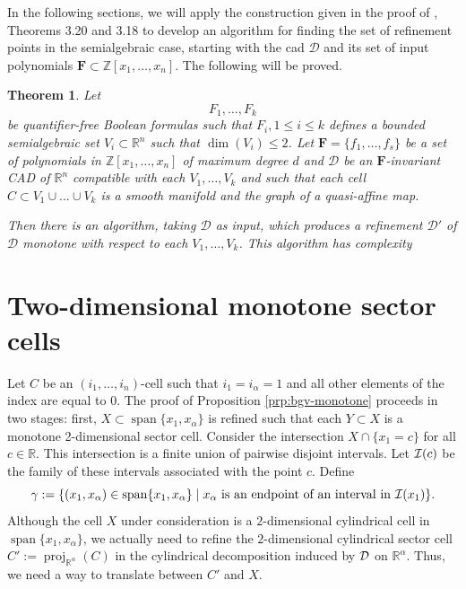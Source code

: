 \documentclass[
]{book}
\newtheorem{theorem}{Theorem}[chapter]
\theoremstyle{definition}
\theoremstyle{definition}
\theoremstyle{definition}
\theoremstyle{definition}
\theoremstyle{remark}
\begin{document}
In the following sections, we will apply the construction given in the proof of \citet{bgv15}, Theorems 3.20 and 3.18 to develop an algorithm for finding the set of refinement points in the semialgebraic case, starting with the cad \(\mathcal{D}\) and its set of input polynomials \(\mathbf{F} \subset \mathbb{Z}[x_1,\ldots,x_n]\). The following will be proved.

\begin{theorem}
\protect\hypertarget{thm:bgv-monotone-algorithm}{}\label{thm:bgv-monotone-algorithm}Let
\[
F_1,\ldots,F_k
\]
be quantifier-free Boolean formulas such that \(F_i, 1\le i \le k\) defines a bounded semialgebraic set \(V_i \subset \mathbb{R}^n\) such that \(\dim(V_i) \le 2\).
Let \(\mathbf{F} = \{f_1,\ldots,f_s\}\) be a set of polynomials in \(\mathbb{Z}[x_1,\ldots,x_n]\) of maximum degree \(d\) and \(\mathcal{D}\) be an \(\mathbf{F}\)-invariant CAD of \(\mathbb{R}^n\) compatible with each \(V_1,\ldots,V_k\) and such that each cell \(C \subset V_1\cup\ldots\cup V_k\) is a smooth manifold and the graph of a quasi-affine map.

Then there is an algorithm, taking \(\mathcal{D}\) as input, which produces a refinement \(\mathcal{D'}\) of \(\mathcal{D}\) monotone with respect to each \(V_1, \ldots, V_k\).
This algorithm has complexity
\end{theorem}

\hypertarget{sec:monotone-sectors}{%
\section{Two-dimensional monotone sector cells}\label{sec:monotone-sectors}}

Let \(C\) be an \((i_1,\ldots,i_n)\)-cell such that \(i_1 = i_\alpha = 1\) and all other elements of the index are equal to \(0\).
The proof of Proposition \ref{prp:bgv-monotone} proceeds in two stages: first, \(X \subset {\operatorname{span} \{x_1,x_\alpha\}}\) is refined such that each \(Y \subset X\) is a monotone 2-dimensional sector cell.
Consider the intersection \(X \cap \{x_1 = c\}\) for all \(c\in \mathbb{R}\). This intersection is a finite union of pairwise disjoint intervals. Let \({\cal I} (c)\) be the family of these intervals associated with the point \(c\). Define
\[
\gamma := \{ (x_1,x_\alpha) \in {\operatorname{span} \{x_1,x_\alpha\}} \mid x_\alpha \text{ is an endpoint of an interval in } {\cal I}(x_1) \}.
\]
Although the cell \(X\) under consideration is a \(2\)-dimensional cylindrical cell in \({\operatorname{span} \{x_1,x_\alpha\}}\), we actually need to refine the \(2\)-dimensional cylindrical sector cell \(C' := {\operatorname{proj}_{\mathbb{R}^{\alpha}}}(C)\) in the cylindrical decomposition induced by \(\cal D\) on \(\mathbb{R}^{\alpha}\). Thus, we need a way to translate between \(C'\) and \(X\).
\end{document}
